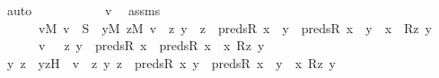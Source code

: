 \begin{isabellebody}
\ auto\ \isanewline
\ \ \isamarkupfalse%
\ \isanewline
\ \ \ \ \isamarkupfalse%
\ v\ \isamarkupfalse%
\ assms{}\ {\isacharcolon}{\kern0pt}\ \isanewline
\ \ \ \ \ \ {\isachardoublequoteopen}{\isasymforall}v{\isasymin}M{\isachardot}{\kern0pt}\ v\ {\isasymin}\ S\ {\isasymlongleftrightarrow}\ {\isacharparenleft}{\kern0pt}{\isasymexists}y{\isasymin}M{\isachardot}{\kern0pt}\ {\isasymexists}z{\isasymin}M{\isachardot}{\kern0pt}\ v\ {\isacharequal}{\kern0pt}\ {\isasymlangle}z{\isacharcomma}{\kern0pt}\ y{\isasymrangle}\ {\isasymand}\ z\ {\isasymin}\ preds{\isacharparenleft}{\kern0pt}R{\isacharcomma}{\kern0pt}\ x{\isacharparenright}{\kern0pt}\ {\isasymand}\ {\isacharparenleft}{\kern0pt}y\ {\isasymin}\ preds{\isacharparenleft}{\kern0pt}R{\isacharcomma}{\kern0pt}\ x{\isacharparenright}{\kern0pt}\ {\isasymor}\ y\ {\isacharequal}{\kern0pt}\ x{\isacharparenright}{\kern0pt}\ {\isasymand}\ R{\isacharparenleft}{\kern0pt}z{\isacharcomma}{\kern0pt}\ y{\isacharparenright}{\kern0pt}{\isacharparenright}{\kern0pt}{\isachardoublequoteclose}\ \isanewline
\ \ \ \ \ \ {\isachardoublequoteopen}v\ {\isasymin}\ {\isacharbraceleft}{\kern0pt}\ {\isacharless}{\kern0pt}z{\isacharcomma}{\kern0pt}\ y{\isachargreater}{\kern0pt}\ {\isasymin}\ preds{\isacharparenleft}{\kern0pt}R{\isacharcomma}{\kern0pt}\ x{\isacharparenright}{\kern0pt}\ {\isasymtimes}\ {\isacharparenleft}{\kern0pt}preds{\isacharparenleft}{\kern0pt}R{\isacharcomma}{\kern0pt}\ x{\isacharparenright}{\kern0pt}\ {\isasymunion}\ {\isacharbraceleft}{\kern0pt}x{\isacharbraceright}{\kern0pt}{\isacharparenright}{\kern0pt}{\isachardot}{\kern0pt}\ R{\isacharparenleft}{\kern0pt}z{\isacharcomma}{\kern0pt}\ y{\isacharparenright}{\kern0pt}\ {\isacharbraceright}{\kern0pt}{\isachardoublequoteclose}\isanewline
\ \ \ \ \isamarkupfalse%
\ \isamarkupfalse%
\ y\ z\ \ yzH\ {\isacharcolon}{\kern0pt}\ {\isachardoublequoteopen}v\ {\isacharequal}{\kern0pt}\ {\isacharless}{\kern0pt}z{\isacharcomma}{\kern0pt}\ y{\isachargreater}{\kern0pt}{\isachardoublequoteclose}\ {\isachardoublequoteopen}z\ {\isasymin}\ preds{\isacharparenleft}{\kern0pt}R{\isacharcomma}{\kern0pt}\ x{\isacharparenright}{\kern0pt}{\isachardoublequoteclose}\ {\isachardoublequoteopen}y\ {\isasymin}\ preds{\isacharparenleft}{\kern0pt}R{\isacharcomma}{\kern0pt}\ x{\isacharparenright}{\kern0pt}\ {\isasymor}\ y\ {\isacharequal}{\kern0pt}\ x{\isachardoublequoteclose}\ {\isachardoublequoteopen}R{\isacharparenleft}{\kern0pt}z{\isacharcomma}{\kern0pt}\ y{\isacharparenright}{\kern0pt}{\isachardoublequoteclose}\ \isamarkupfalse%

\end{isabellebody}
